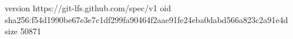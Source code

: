 version https://git-lfs.github.com/spec/v1
oid sha256:f54d1990be67e3e7c1df299fa90464f2aae91fe24eba0dabd566a823c2a91e4d
size 50871
